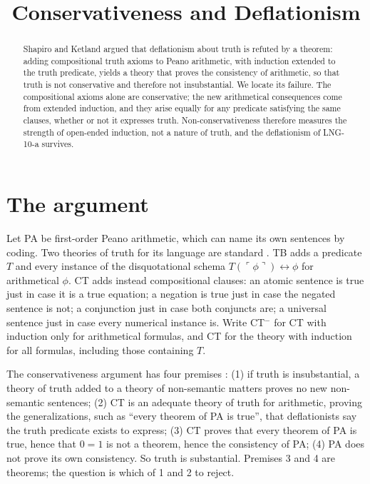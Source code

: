 \documentclass{situationist-preprint}
\title{Conservativeness and Deflationism}
\begin{document}
\maketitle

\begin{abstract}
Shapiro and Ketland argued that deflationism about truth is refuted by a theorem: adding compositional truth axioms to Peano arithmetic, with induction extended to the truth predicate, yields a theory that proves the consistency of arithmetic, so that truth is not conservative and therefore not insubstantial. We locate its failure. The compositional axioms alone are conservative; the new arithmetical consequences come from extended induction, and they arise equally for any predicate satisfying the same clauses, whether or not it expresses truth. Non-conservativeness therefore measures the strength of open-ended induction, not a nature of truth, and the deflationism of LNG-10-a survives.
\end{abstract}

\section{The argument}

Let PA be first-order Peano arithmetic, which can name its own sentences by coding. Two theories of truth for its language are standard \citep{Halbach2011}. TB adds a predicate $T$ and every instance of the disquotational schema $T(\ulcorner\phi\urcorner) \leftrightarrow \phi$ for arithmetical $\phi$. CT adds instead compositional clauses: an atomic sentence is true just in case it is a true equation; a negation is true just in case the negated sentence is not; a conjunction just in case both conjuncts are; a universal sentence just in case every numerical instance is. Write CT$^-$ for CT with induction only for arithmetical formulas, and CT for the theory with induction for all formulas, including those containing $T$.

The conservativeness argument has four premises \citep{Shapiro1998,Ketland1999}: (1) if truth is insubstantial, a theory of truth added to a theory of non-semantic matters proves no new non-semantic sentences; (2) CT is an adequate theory of truth for arithmetic, proving the generalizations, such as \enquote{every theorem of PA is true}, that deflationists say the truth predicate exists to express; (3) CT proves that every theorem of PA is true, hence that $0 = 1$ is not a theorem, hence the consistency of PA; (4) PA does not prove its own consistency. So truth is substantial. Premises 3 and 4 are theorems; the question is which of 1 and 2 to reject.
\end{document}
